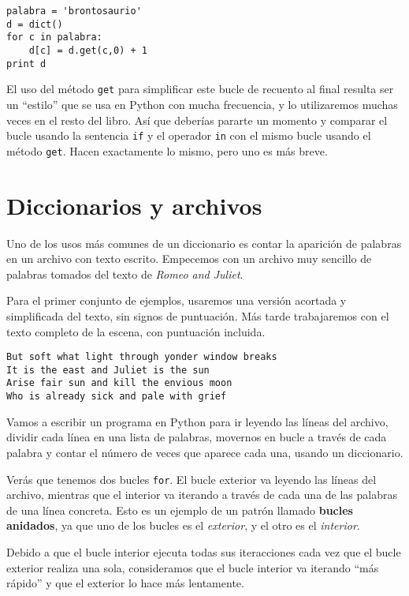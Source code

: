\beforeverb
\begin{verbatim}
palabra = 'brontosaurio'
d = dict()
for c in palabra:
    d[c] = d.get(c,0) + 1
print d
\end{verbatim}
\afterverb
%
El uso del método {\tt get} para simplificar este bucle de recuento
al final resulta ser un ``estilo'' que se usa en Python con mucha frecuencia, y
lo utilizaremos muchas veces en el resto del libro. Así que deberías
pararte un momento y comparar el bucle usando la sentencia {\tt if}
y el operador {\tt in} con el mismo bucle usando el método {\tt get}.
Hacen exactamente lo mismo, pero uno es más breve.

\section{Diccionarios y archivos}

Uno de los usos más comunes de un diccionario es contar la aparición
de palabras en un archivo con texto escrito.
Empecemos con un archivo muy sencillo de
palabras tomados del texto de \emph{Romeo and Juliet}.

Para el primer conjunto de ejemplos, usaremos una versión acortada y simplificada
del texto, sin signos de puntuación. Más tarde trabajaremos con el texto completo
de la escena, con puntuación incluida.

\beforeverb
\begin{verbatim}
But soft what light through yonder window breaks
It is the east and Juliet is the sun
Arise fair sun and kill the envious moon
Who is already sick and pale with grief
\end{verbatim}
\afterverb
%
Vamos a escribir un programa en Python para ir leyendo las líneas del archivo,
dividir cada línea en una lista de palabras, movernos en bucle a través de cada
palabra y contar el número de veces que aparece cada una, usando un diccionario.

Verás que tenemos dos bucles {\tt for}. El bucle exterior va leyendo las
líneas del archivo, mientras que el interior va iterando a través de cada
una de las palabras de una línea concreta. Esto es un ejemplo
de un patrón llamado {\bf bucles anidados}, ya que uno de los bucles
es el \emph{exterior}, y el otro es el \emph{interior}.

Debido a que el bucle interior ejecuta todas sus iteracciones cada vez
que el bucle exterior realiza una sola, consideramos
que el bucle interior va iterando ``más rápido'' y que el exterior lo hace
más lentamente.

